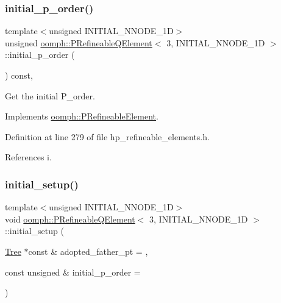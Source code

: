 \subsubsection{\texorpdfstring{initial\+\_\+p\+\_\+order()}{initial\_p\_order()}}
{\footnotesize\ttfamily template$<$unsigned I\+N\+I\+T\+I\+A\+L\+\_\+\+N\+N\+O\+D\+E\+\_\+1D$>$ \\
unsigned \hyperlink{classoomph_1_1PRefineableQElement}{oomph\+::\+P\+Refineable\+Q\+Element}$<$ 3, I\+N\+I\+T\+I\+A\+L\+\_\+\+N\+N\+O\+D\+E\+\_\+1D $>$\+::initial\+\_\+p\+\_\+order (\begin{DoxyParamCaption}{ }\end{DoxyParamCaption}) const\hspace{0.3cm}{\ttfamily [inline]}, {\ttfamily [virtual]}}



Get the initial P\+\_\+order. 



Implements \hyperlink{classoomph_1_1PRefineableElement_a6babd48e981414ad54cbfc1d89977f43}{oomph\+::\+P\+Refineable\+Element}.



Definition at line 279 of file hp\+\_\+refineable\+\_\+elements.\+h.



References i.

\mbox{\label{classoomph_1_1PRefineableQElement_3_013_00_01INITIAL__NNODE__1D_01_4_a46ecfac0c9c6f00bd70d8cacf8afc395}} 
\subsubsection{\texorpdfstring{initial\+\_\+setup()}{initial\_setup()}}
{\footnotesize\ttfamily template$<$unsigned I\+N\+I\+T\+I\+A\+L\+\_\+\+N\+N\+O\+D\+E\+\_\+1D$>$ \\
void \hyperlink{classoomph_1_1PRefineableQElement}{oomph\+::\+P\+Refineable\+Q\+Element}$<$ 3, I\+N\+I\+T\+I\+A\+L\+\_\+\+N\+N\+O\+D\+E\+\_\+1D $>$\+::initial\+\_\+setup (\begin{DoxyParamCaption}\item[{\hyperlink{classoomph_1_1Tree}{Tree} $\ast$const \&}]{adopted\+\_\+father\+\_\+pt = {},  }\item[{const unsigned \&}]{initial\+\_\+p\+\_\+order = {} }\end{DoxyParamCaption})\hspace{0.3cm}{\ttfamily [virtual]}}



